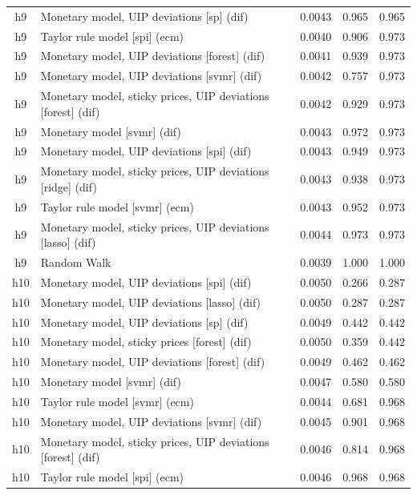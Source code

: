 \begin{ThreePartTable}
\begin{longtable}[t]{cp{5.5cm}ccc}
\addlinespace
h9 & \raggedright Monetary model, UIP deviations [sp] (dif) & 0.0043 & 0.965 & 0.965\\
h9 & \raggedright Taylor rule model [spi] (ecm) & 0.0040 & 0.906 & 0.973\\
h9 & \raggedright Monetary model, UIP deviations [forest] (dif) & 0.0041 & 0.939 & 0.973\\
h9 & \raggedright Monetary model, UIP deviations [svmr] (dif) & 0.0042 & 0.757 & 0.973\\
h9 & \raggedright Monetary model, sticky prices, UIP deviations [forest] (dif) & 0.0042 & 0.929 & 0.973\\
h9 & \raggedright Monetary model [svmr] (dif) & 0.0043 & 0.972 & 0.973\\
h9 & \raggedright Monetary model, UIP deviations [spi] (dif) & 0.0043 & 0.949 & 0.973\\
h9 & \raggedright Monetary model, sticky prices, UIP deviations [ridge] (dif) & 0.0043 & 0.938 & 0.973\\
h9 & \raggedright Taylor rule model [svmr] (ecm) & 0.0043 & 0.952 & 0.973\\
h9 & \raggedright Monetary model, sticky prices, UIP deviations [lasso] (dif) & 0.0044 & 0.973 & 0.973\\
h9 & \raggedright Random Walk & 0.0039 & 1.000 & 1.000\\
\addlinespace
h10 & \raggedright Monetary model, UIP deviations [spi] (dif) & 0.0050 & 0.266 & 0.287\\
h10 & \raggedright Monetary model, UIP deviations [lasso] (dif) & 0.0050 & 0.287 & 0.287\\
h10 & \raggedright Monetary model, UIP deviations [sp] (dif) & 0.0049 & 0.442 & 0.442\\
h10 & \raggedright Monetary model, sticky prices [forest] (dif) & 0.0050 & 0.359 & 0.442\\
h10 & \raggedright Monetary model, UIP deviations [forest] (dif) & 0.0049 & 0.462 & 0.462\\
h10 & \raggedright Monetary model [svmr] (dif) & 0.0047 & 0.580 & 0.580\\
h10 & \raggedright Taylor rule model [svmr] (ecm) & 0.0044 & 0.681 & 0.968\\
h10 & \raggedright Monetary model, UIP deviations [svmr] (dif) & 0.0045 & 0.901 & 0.968\\
h10 & \raggedright Monetary model, sticky prices, UIP deviations [forest] (dif) & 0.0046 & 0.814 & 0.968\\
h10 & \raggedright Taylor rule model [spi] (ecm) & 0.0046 & 0.968 & 0.968\\

\end{longtable}
\end{ThreePartTable}
